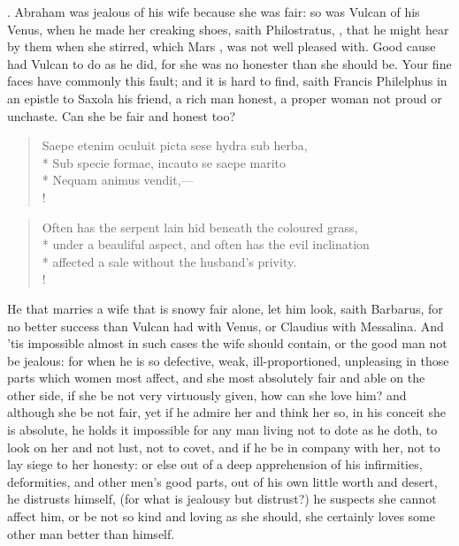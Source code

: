 . Abraham was jealous of his wife because she
was fair: so was Vulcan of his Venus, when he made her creaking shoes, saith
Philostratus, , that he might hear by them when she stirred, which Mars ,
was not well pleased with. Good cause had Vulcan to do as he did,
for she was no honester than she should be. Your fine faces have
commonly this fault; and it is hard to find, saith Francis Philelphus
in an epistle to Saxola his friend, a rich man honest, a proper woman
not proud or unchaste. Can she be fair and honest too?
%
\begin{latin}
\begin{verse}%
Saepe etenim oculuit picta sese hydra sub herba,\\*
Sub specie formae, incauto se saepe marito\\*
Nequam animus vendit,---\\!
\end{verse}%
\end{latin}
\translationrule%
\begin{verse}%
Often has the serpent lain hid beneath the coloured grass,\\*
under a beauliful aspect, and often has the evil inclination\\*
affected a sale without the husband's privity.\\!
\end{verse}%
%

He that marries a wife that is snowy fair alone, let him look, saith
 Barbarus, for no better success than Vulcan had with Venus, or
Claudius with Messalina. And 'tis impossible almost in such cases the
wife should contain, or the good man not be jealous: for when he is so
defective, weak, ill-proportioned, unpleasing in those parts which
women most affect, and she most absolutely fair and able on the other
side, if she be not very virtuously given, how can she love him? and
although she be not fair, yet if he admire her and think her so, in his
conceit she is absolute, he holds it impossible for any man living not
to dote as he doth, to look on her and not lust, not to covet, and if
he be in company with her, not to lay siege to her honesty: or else out
of a deep apprehension of his infirmities, deformities, and other men's
good parts, out of his own little worth and desert, he distrusts
himself, (for what is jealousy but distrust?) he suspects she cannot
affect him, or be not so kind and loving as she should, she certainly
loves some other man better than himself.


